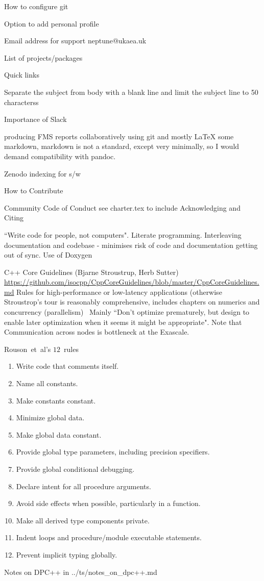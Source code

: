 
How to configure git

Option to add personal profile

Email address for support neptune@ukaea.uk

List of projects/packages

Quick links

Separate the subject from body with a blank line and limit the subject line to 50 characterss

Importance of Slack

producing FMS reports collaboratively using git and mostly LaTeX some markdown,
markdown is not a standard, except very minimally, so I would demand compatibility with pandoc.

Zenodo indexing for s/w

How to Contribute

Community Code of Conduct see charter.tex
to include  Acknowledging and Citing

``Write code for people, not computers".
Literate programming. Interleaving documentation and codebase - minimises risk of code and documentation getting out of sync.
Use of Doxygen

C++ Core Guidelines (Bjarne Stroustrup, Herb Sutter)
\url{https://github.com/isocpp/CppCoreGuidelines/blob/master/CppCoreGuidelines.md}
Rules for high-performance or low-latency applications (otherwise Stroustrop's tour is 
reasonably comprehensive, includes chapters on numerics and
concurrency (parallelism)~\cite[\S\S\,14,15]{stroustroptour}
Mainly ``Don't optimize prematurely, but design to enable later optimization when it seems
it might be appropriate". Note that
Communication across nodes is \exc bottleneck at the Exascale.

Rouson~et~al's $12$~rules
\begin{enumerate}
\item Write code that comments itself.
\item Name all constants.
\item Make constants constant.
\item Minimize global data.
\item Make global data constant.
\item Provide global type parameters, including precision specifiers.
\item Provide global conditional debugging.
\item Declare intent for all procedure arguments.
\item Avoid side effects when possible, particularly in a function.
\item Make all derived type components private.
\item Indent loops and procedure/module executable statements.
\item Prevent implicit typing globally.
\end{enumerate}

Notes on DPC++ in ../ts/notes\_on\_dpc++.md
